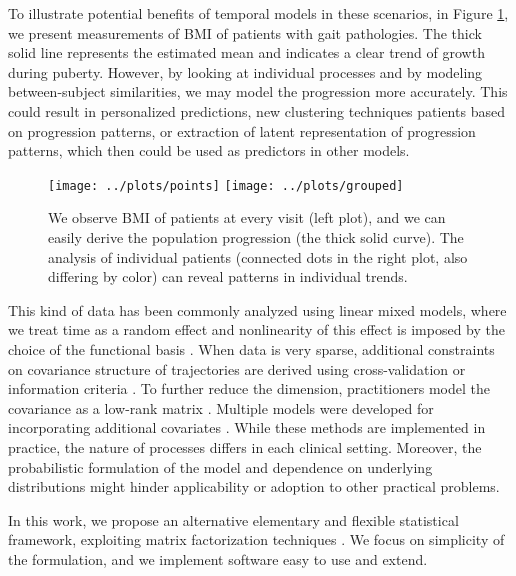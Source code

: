 \documentclass[preprint]{imsart}
\numberwithin{equation}{section}
\theoremstyle{plain}
\begin{document}

To illustrate potential benefits of temporal models in these scenarios, in Figure \ref{fig:motivation}, we present measurements of BMI of patients with gait pathologies. The thick solid line represents the estimated mean and indicates a clear trend of growth during puberty. However, by looking at individual processes and by modeling between-subject similarities, we may model the progression more accurately. This could result in personalized predictions, new clustering techniques patients based on progression patterns, or extraction of latent representation of progression patterns, which then could be used as predictors in other models. 

\begin{figure}[h]
  \texttt{[image: ../plots/points]}
  \texttt{[image: ../plots/grouped]}
  \caption{We observe BMI of patients at every visit (left plot), and we can easily derive the population progression (the thick solid curve). The analysis of individual patients (connected dots in the right plot, also differing by color) can reveal patterns in individual trends.}
  \label{fig:motivation}
\end{figure}

This kind of data has been commonly analyzed using linear mixed models, where we treat time as a random effect and nonlinearity of this effect is imposed by the choice of the functional basis \citep{zeger1988models, verbeke1997linear, mcculloch2001generalized}. When data is very sparse, additional constraints on covariance structure of trajectories are derived using cross-validation or information criteria \citep{rice2001nonparametric,bigelow2009bayesian}. To further reduce the dimension, practitioners model the covariance as a low-rank matrix \citep{james2000principal,berkey1983longitudinal, yan2017dynamic, hall2006properties, besse1986principal, yao2006penalized, greven2011longitudinal}. Multiple models were developed for incorporating additional covariates \citep{song2002semiparametric, liu2009joint, rizopoulos2014combining}. While these methods are implemented in practice, the nature of processes differs in each clinical setting. Moreover, the probabilistic formulation of the model and dependence on underlying distributions might hinder applicability or adoption to other practical problems.

In this work, we propose an alternative elementary and flexible statistical framework, exploiting matrix factorization techniques \citep{mazumder2010spectral, hastie2015matrix, fazel2002matrix, cai2010singular}. We focus on simplicity of the formulation, and we implement software easy to use and extend. 
\end{document}
